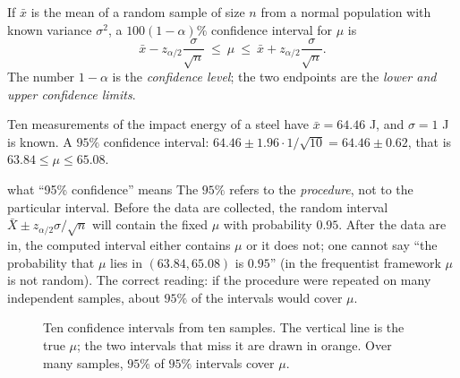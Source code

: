\begin{definition}
If $\bar{x}$ is the mean of a random sample of size $n$ from a normal population with known variance $\sigma^2$, a $100(1-\alpha)\%$ confidence interval for $\mu$ is
\[ \bar{x}-z_{\alpha/2}\frac\sigma{\sqrt n}\ \le\ \mu\ \le\ \bar{x}+z_{\alpha/2}\frac\sigma{\sqrt n}. \]
The number $1-\alpha$ is the \emph{confidence level}; the two endpoints are the \emph{lower and upper confidence limits}.
\end{definition}

\begin{example}\label{ex:ci-known}
Ten measurements of the impact energy of a steel have $\bar{x}=64.46$ J, and $\sigma=1$ J is known. A $95\%$ confidence interval: $64.46\pm1.96\cdot1/\sqrt{10}=64.46\pm0.62$, that is $63.84\le\mu\le65.08$.
\end{example}

\begin{pitfall}{what ``95\% confidence'' means}
The $95\%$ refers to the \emph{procedure}, not to the particular interval. Before the data are collected, the random interval $\bar{X}\pm z_{\alpha/2}\sigma/\sqrt n$ will contain the fixed $\mu$ with probability $0.95$. After the data are in, the computed interval either contains $\mu$ or it does not; one cannot say ``the probability that $\mu$ lies in $(63.84,65.08)$ is $0.95$'' (in the frequentist framework $\mu$ is not random). The correct reading: if the procedure were repeated on many independent samples, about $95\%$ of the intervals would cover $\mu$.
\end{pitfall}

\begin{figure}[h]
\centering
{}
\caption{Ten confidence intervals from ten samples. The vertical line is the true $\mu$; the two intervals that miss it are drawn in orange. Over many samples, $95\%$ of $95\%$ intervals cover $\mu$.}
\end{figure}

